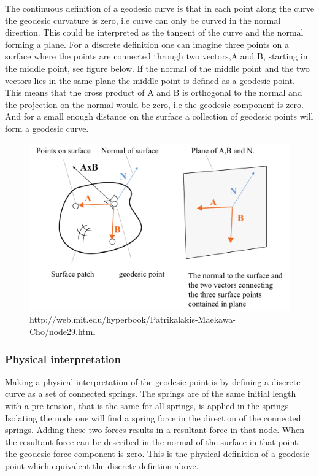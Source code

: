 The continuous definition of a geodesic curve is that in each point along the curve the geodesic curvature is zero, i.e curve can only be curved in the normal direction. This could be interpreted as the tangent of the curve and the normal forming a plane. For a discrete definition one can imagine three points on a surface where the points are connected through two vectors,A and B, starting in the middle point, see figure below. If the normal of the middle point and the two vectors lies in the same plane the middle point is defined as a geodesic point. This means that the cross product of A and B is orthogonal to the normal and the projection on the normal would be zero, i.e the geodesic component is zero. And for a small enough distance on the surface a collection of geodesic points will form a geodesic curve.

\begin{figure}[H]
\centering
\includegraphics[width = 0.8\linewidth ]{figure/Method/defintionGeodeiscPoint.pdf}
\caption{http://web.mit.edu/hyperbook/Patrikalakis-Maekawa-Cho/node29.html}
\end{figure}

\subsubsection{Physical interpretation}

Making a physical interpretation of the geodesic point is by defining a discrete curve as a set of connected springs. The springs are of the same initial length with a pre-tension, that is the same for all springs, is applied in the springs. Isolating the node one will find a spring force in the direction of the connected springs. Adding these two forces results in a resultant force in that node. When the resultant force can be described in  the normal of the surface in that point, the geodesic force component is zero. This is the physical definition of a geodesic point which equivalent the discrete defintion above.

